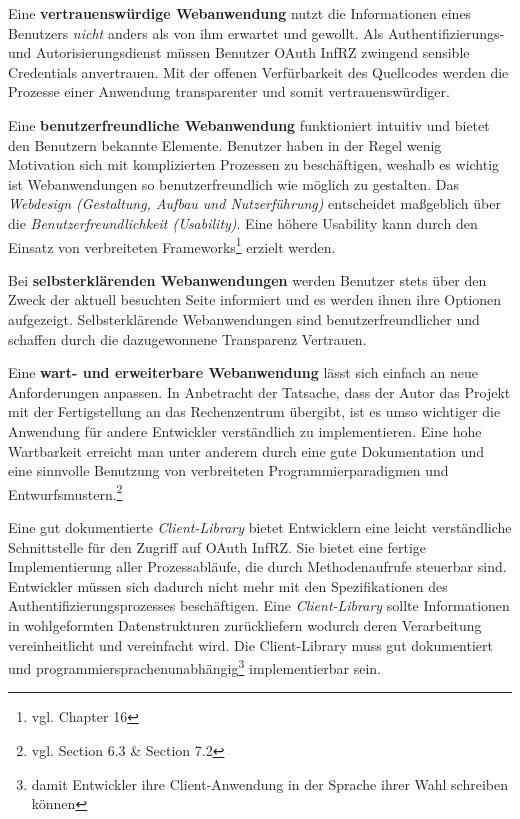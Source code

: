 \documentclass[12pt,a4paper,pointednumbers,abstracton]{scrartcl}
\begin{document}
Eine \textbf{vertrauenswürdige Webanwendung} nutzt die Informationen eines Benutzers \emph{nicht} anders als von ihm erwartet und gewollt.
Als Authentifizierungs- und Autorisierungsdienst müssen Benutzer OAuth InfRZ zwingend sensible Credentials anvertrauen.
Mit der offenen Verfürbarkeit des Quellcodes werden die Prozesse einer Anwendung transparenter und somit vertrauenswürdiger.

Eine \textbf{benutzerfreundliche Webanwendung} funktioniert intuitiv und bietet den Benutzern bekannte Elemente.
Benutzer haben in der Regel wenig Motivation sich mit komplizierten Prozessen zu beschäftigen, weshalb es wichtig ist Webanwendungen so benutzerfreundlich wie möglich zu gestalten.
Das \emph{Webdesign (Gestaltung, Aufbau und Nutzerführung)} entscheidet maßgeblich über die \emph{Benutzerfreundlichkeit (Usability)}.
Eine höhere Usability kann durch den Einsatz von verbreiteten Frameworks\footnote{vgl. \cite{Som10} Chapter 16} erzielt werden.

Bei \textbf{selbsterklärenden Webanwendungen} werden Benutzer stets über den Zweck der aktuell besuchten Seite informiert und es werden ihnen ihre Optionen aufgezeigt.
Selbsterklärende Webanwendungen sind benutzerfreundlicher und schaffen durch die dazugewonnene Transparenz Vertrauen.

Eine \textbf{wart- und erweiterbare  Webanwendung} lässt sich einfach an neue Anforderungen anpassen.
In Anbetracht der Tatsache, dass der Autor das Projekt mit der Fertigstellung an das Rechenzentrum übergibt, ist es umso wichtiger die Anwendung für andere Entwickler verständlich zu implementieren.
Eine hohe Wartbarkeit erreicht man unter anderem durch eine gute Dokumentation und eine sinnvolle Benutzung von verbreiteten Programmierparadigmen und Entwurfsmustern.\footnote{vgl. \cite{Som10} Section 6.3 \& Section 7.2}

Eine gut dokumentierte \emph{Client-Library} bietet Entwicklern eine leicht verständliche Schnittstelle für den Zugriff auf OAuth InfRZ.
Sie bietet eine fertige Implementierung aller Prozessabläufe, die durch Methodenaufrufe steuerbar sind.
Entwickler müssen sich dadurch nicht mehr mit den Spezifikationen des Authentifizierungsprozesses beschäftigen.
Eine \emph{Client-Library} sollte Informationen in wohlgeformten Datenstrukturen zurückliefern wodurch deren Verarbeitung vereinheitlicht und vereinfacht wird.
Die Client-Library muss gut dokumentiert und programmiersprachenunabhängig\footnote{damit Entwickler ihre Client-Anwendung in der Sprache ihrer Wahl schreiben können} implementierbar sein.
\end{document}
